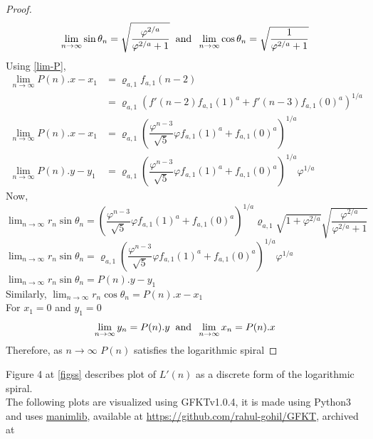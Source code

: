 \documentclass[preprint,12pt]{elsarticle}
\begin{document}
\begin{proof}
	$$\lim_{n \to \infty}\sin\theta_n = \sqrt{\dfrac{\varphi^{2/a}}{\varphi^{2/a}+1}}\hspace{2mm}\text{and}\hspace{2mm}\lim_{n \to \infty}\cos\theta_n = \sqrt{\dfrac{1}{\varphi^{2/a}+1}}$$
	Using \ref{lim-P},\\
	\begin{align*}
		\lim_{n \to \infty}P(n).x-x_1 &= \varrho_{a,1}f_{a,1}(n-2)\\
		&=\varrho_{a,1}\left(f'(n-2)f_{a,1}(1)^a+f'(n-3)f_{a,1}(0)^a\right)^{1/a}\\
		\lim_{n \to \infty}P(n).x-x_1&=\varrho_{a,1}\left(\dfrac{\varphi^{n-3}}{\sqrt{5}}\varphi f_{a,1}(1)^a+f_{a,1}(0)^a\right)^{1/a}\\
		\lim_{n \to \infty}P(n).y - y_1 &= \varrho_{a,1}\left(\dfrac{\varphi^{n-3}}{\sqrt{5}}\varphi f_{a,1}(1)^a+f_{a,1}(0)^a\right)^{1/a} \varphi^{1/a}
 	\end{align*}
 	Now,\\
 	$\displaystyle\lim_{n \to \infty}r_n\sin\theta_n=\left(\dfrac{\varphi^{n-3}}{\sqrt{5}}\varphi f_{a,1}(1)^a+f_{a,1}(0)^a\right)^{1/a}\varrho_{a,1}\sqrt{1+\varphi^{2/a}}\sqrt{\dfrac{\varphi^{2/a}}{\varphi^{2/a}+1}} $\\
 	$\displaystyle\lim_{n \to \infty}r_n\sin\theta_n=\varrho_{a,1}\left(\dfrac{\varphi^{n-3}}{\sqrt{5}}\varphi f_{a,1}(1)^a+f_{a,1}(0)^a\right)^{1/a} \varphi^{1/a}$\\
 	$\displaystyle\lim_{n \to \infty}r_n\sin\theta_n=P(n).y-y_1$\\
 	Similarly, $\displaystyle\lim_{n \to \infty}r_n\cos\theta_n=P(n).x-x_1$\\
	For $x_1 = 0$ and $y_1 = 0$
	$$\lim_{n \to \infty}y_n = P(n).y\hspace{2mm}\text{and}\hspace{2mm}\lim_{n \to \infty}x_n = P(n).x$$
	Therefore, as $n \to \infty$ $P(n)$ satisfies the logarithmic spiral
\end{proof}
Figure 4 at \ref{figss} describes plot of $L'(n)$ as a discrete form of the logarithmic spiral.\\
The following plots are visualized using GFKTv1.0.4\cite{software}, it is made using Python3 and uses \href{https://github.com/3b1b/manim}{manimlib}, available at \href{https://github.com/rahul-gohil/GFKT}{https://github.com/rahul-gohil/GFKT}, archived at 
\end{document}
